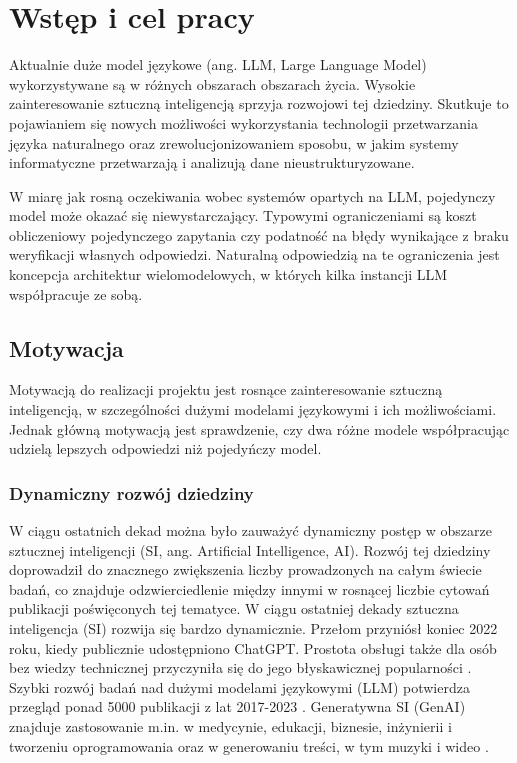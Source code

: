\chapter{Wstęp i cel pracy}

Aktualnie duże model językowe (ang. LLM, Large Language Model) wykorzystywane są w różnych obszarach obszarach życia. Wysokie zainteresowanie sztuczną inteligencją sprzyja rozwojowi tej dziedziny. Skutkuje to pojawianiem się nowych możliwości wykorzystania technologii przetwarzania języka naturalnego oraz zrewolucjonizowaniem sposobu, w jakim systemy informatyczne przetwarzają i analizują dane nieustrukturyzowane. 

W miarę jak rosną oczekiwania wobec systemów opartych na LLM, pojedynczy model może okazać się niewystarczający. Typowymi ograniczeniami są koszt obliczeniowy pojedynczego zapytania czy podatność na błędy wynikające z braku weryfikacji własnych odpowiedzi. Naturalną odpowiedzią na te ograniczenia jest koncepcja architektur wielomodelowych, w których kilka instancji LLM współpracuje ze sobą.

\section{Motywacja}

Motywacją do realizacji projektu jest rosnące zainteresowanie sztuczną inteligencją, w szczególności dużymi modelami językowymi i ich możliwościami. Jednak główną motywacją jest sprawdzenie, czy dwa różne modele współpracując udzielą lepszych odpowiedzi niż pojedyńczy model.

\subsection{Dynamiczny rozwój dziedziny}

W ciągu ostatnich dekad można było zauważyć dynamiczny postęp w obszarze sztucznej inteligencji (SI, ang. Artificial Intelligence, AI). Rozwój tej dziedziny doprowadził do znacznego zwiększenia liczby prowadzonych na całym świecie badań, co znajduje odzwierciedlenie między innymi w rosnącej liczbie cytowań publikacji poświęconych tej tematyce. W ciągu ostatniej dekady sztuczna inteligencja (SI) rozwija się bardzo dynamicznie. Przełom przyniósł koniec 2022 roku, kiedy publicznie udostępniono ChatGPT. Prostota obsługi także dla osób bez wiedzy technicznej przyczyniła się do jego błyskawicznej popularności \cite{feuerriegel_generative_ai}. Szybki rozwój badań nad dużymi modelami językowymi (LLM) potwierdza przegląd ponad 5000 publikacji z lat 2017-2023 \cite{bibliometric_llm_review}. Generatywna SI (GenAI) znajduje zastosowanie m.in. w medycynie, edukacji, biznesie, inżynierii i tworzeniu oprogramowania oraz w generowaniu treści, w tym muzyki i wideo \cite{feuerriegel_generative_ai,bibliometric_llm_review}.

